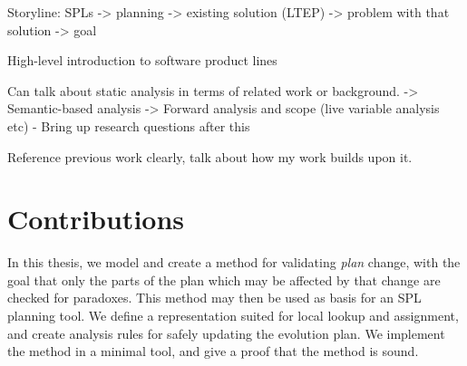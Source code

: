 Storyline: SPLs -> planning -> existing solution (LTEP) -> problem with that solution -> goal

High-level introduction to software product lines

Can talk about static analysis in terms of related work or background.
-> Semantic-based analysis
-> Forward analysis and scope (live variable analysis etc)
- Bring up research questions after this

Reference previous work clearly, talk about how my work builds upon it.

\section{Contributions}

In this thesis, we model and create a method for validating \emph{plan} change, with the goal that only the parts of the plan which may be affected by that change are checked for paradoxes. This method may then be used as basis for an SPL planning tool. We define a representation suited for local lookup and assignment, and create analysis rules for safely updating the evolution plan. We implement the method in a minimal tool, and give a proof that the method is sound.



